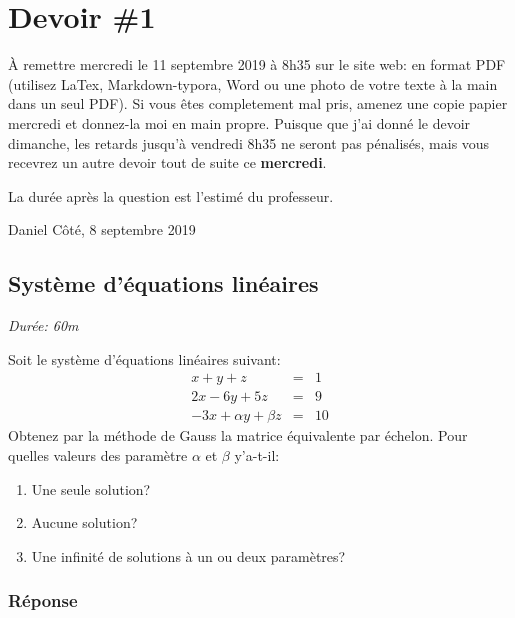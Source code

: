 \section{Devoir \#1}

À remettre mercredi le 11 septembre 2019 à 8h35 sur le site web: en
format PDF (utilisez LaTex, Markdown-typora, Word ou une photo de votre
texte à la main dans un seul PDF). Si vous êtes completement mal pris,
amenez une copie papier mercredi et donnez-la moi en main propre.
Puisque que j'ai donné le devoir dimanche, les retards jusqu'à vendredi
8h35 ne seront pas pénalisés, mais vous recevrez un autre devoir tout de
suite ce \textbf{mercredi}.

La durée après la question est l'estimé du professeur.

Daniel Côté, 8 septembre 2019

\subsection{Système d'équations linéaires}

\emph{Durée: 60m}

Soit le système d'équations linéaires suivant: \[
\begin{eqnarray}
x + y + z & = & 1 \\
2x -6y + 5z  & = & 9 \\
-3x + \alpha y + \beta z & = & 10
\end{eqnarray}
\] Obtenez par la méthode de Gauss la matrice équivalente par échelon.
Pour quelles valeurs des paramètre \(\alpha\) et \(\beta\) y'a-t-il:

\begin{enumerate}
\def\labelenumi{\arabic{enumi}.}
\tightlist
\item
  Une seule solution?
\item
  Aucune solution?
\item
  Une infinité de solutions à un ou deux paramètres?
\end{enumerate}

\subsubsection{Réponse}


